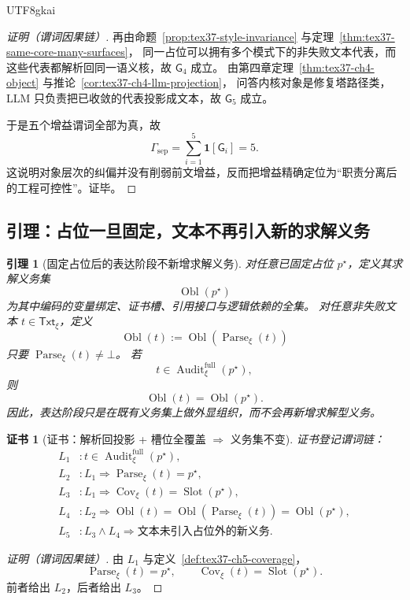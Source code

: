 \documentclass[12pt]{article}
\newtheorem{lemma}{引理}[section]
\newtheorem{Certificate}{证书}[section]
\newcommand{\Parse}{\operatorname{Parse}}
\newcommand{\Audit}{\operatorname{Audit}}
\begin{document}
\begin{CJK*}{UTF8}{gkai}
\begin{proof}[证明（谓词因果链）]
再由命题~\ref{prop:tex37-style-invariance} 与定理~\ref{thm:tex37-same-core-many-surfaces}，
同一占位可以拥有多个模式下的非失败文本代表，而这些代表都解析回同一语义核，故 $\mathsf{G}_4$ 成立。
由第四章定理~\ref{thm:tex37-ch4-object} 与推论~\ref{cor:tex37-ch4-llm-projection}，
问答内核对象是修复塔路径类，LLM 只负责把已收敛的代表投影成文本，故 $\mathsf{G}_5$ 成立。

于是五个增益谓词全部为真，故
\[
  \Gamma_{\mathrm{sep}}
  =
  \sum_{i=1}^{5}\mathbf{1}[\mathsf{G}_i]
  =5.
\]
这说明对象层次的纠偏并没有削弱前文增益，反而把增益精确定位为“职责分离后的工程可控性”。证毕。
\end{proof}

\subsection{引理：占位一旦固定，文本不再引入新的求解义务}
\label{subsec:tex37-ch5-lemma}

\begin{lemma}[固定占位后的表达阶段不新增求解义务]
\label{lem:tex37-ch5-no-new-solve}
对任意已固定占位 $p^\star$，定义其求解义务集
\[
  \operatorname{Obl}(p^\star)
\]
为其中编码的变量绑定、证书槽、引用接口与逻辑依赖的全集。
对任意非失败文本 $t\in\mathsf{Txt}_\xi$，定义
\[
  \operatorname{Obl}(t)
  :=
  \operatorname{Obl}(\Parse_\xi(t))
\]
只要 $\Parse_\xi(t)\neq\bot$。
若
\[
  t\in \Audit^{\mathrm{full}}_\xi(p^\star),
\]
则
\[
  \operatorname{Obl}(t)=\operatorname{Obl}(p^\star).
\]
因此，表达阶段只是在既有义务集上做外显组织，而不会再新增求解型义务。
\end{lemma}

\begin{Certificate}[证书：解析回投影 + 槽位全覆盖 $\Rightarrow$ 义务集不变]
\label{cert:tex37-ch5-no-new-solve}
证书登记谓词链：
\[
\begin{aligned}
  L_1 &: t\in \Audit^{\mathrm{full}}_\xi(p^\star),\\
  L_2 &: L_1\Rightarrow \Parse_\xi(t)=p^\star,\\
  L_3 &: L_1\Rightarrow \operatorname{Cov}_\xi(t)=\operatorname{Slot}(p^\star),\\
  L_4 &: L_2\Rightarrow \operatorname{Obl}(t)=\operatorname{Obl}(\Parse_\xi(t))=\operatorname{Obl}(p^\star),\\
  L_5 &: L_3\wedge L_4\Rightarrow \text{文本未引入占位外的新义务}.
\end{aligned}
\]
\end{Certificate}

\begin{proof}[证明（谓词因果链）]
由 $L_1$ 与定义~\ref{def:tex37-ch5-coverage}，
\[
  \Parse_\xi(t)=p^\star,
  \qquad
  \operatorname{Cov}_\xi(t)=\operatorname{Slot}(p^\star).
\]
前者给出 $L_2$，后者给出 $L_3$。


\end{proof}
\end{CJK*}
\end{document}
